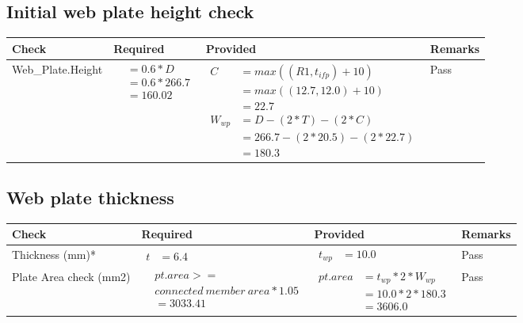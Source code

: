 \documentclass{article}%
\begin{document}
%
\newpage%
\subsection{Initial web plate height check}%
\label{subsec:Initialwebplateheightcheck}%
\renewcommand{\arraystretch}{1.2}%
\begin{longtable}{|p{4.5cm}|p{2.5cm}|p{7cm}|p{1.5cm}|}%
\hline%
\rowcolor{OsdagGreen}%
Check&Required&Provided&Remarks\\%
\hline%
\endhead%
\hline%
Web\_Plate.Height&$\begin{aligned}  &= 0.6 *D\\  &= 0.6 *266.7\\  &= 160.02\end{aligned}$&$\begin{aligned} C~~ &= max((R1, t_{ifp}) + 10) \\ &= max((12.7,12.0) +10) \\ &= 22.7 \\  W_{wp} &= D - (2 * T) - (2 * C)\\  &= 266.7 - (2 * 20.5) - (2 *22.7)\\  &=180.3\end{aligned}$&Pass\\%
\hline%
\end{longtable}

%
\newpage%
\subsection{Web plate thickness}%
\label{subsec:Webplatethickness}%
\renewcommand{\arraystretch}{1.2}%
\begin{longtable}{|p{2.5cm}|p{5cm}|p{6.5cm}|p{1.5cm}|}%
\hline%
\rowcolor{OsdagGreen}%
Check&Required&Provided&Remarks\\%
\hline%
\endhead%
\hline%
Thickness (mm)*&$\begin{aligned} t &=6.4\end{aligned}$&$\begin{aligned} t_{wp} &=10.0\end{aligned}$&Pass\\%
\hline%
Plate Area check (mm2)&$\begin{aligned} &pt.area >= \\&connected~member~area * 1.05\\  &= 3033.41\end{aligned}$&$\begin{aligned}pt.area &= t_{wp} *2*  W_{wp} \\ &= 10.0*2* 180.3\\ &= 3606.0\end{aligned}$&Pass\\%
\hline%
\end{longtable}
\end{document}
